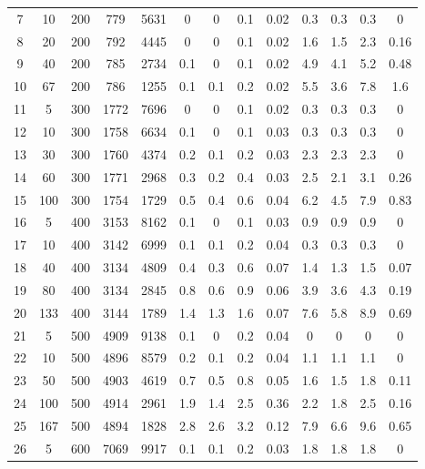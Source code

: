 \documentclass[11pt]{article}
\begin{document}
\begin{table}[]
{\begin{tabular}{ccccc|cccc|cccc}
			7 & 10 & 200 & 779 & 5631 & 0 & 0 & 0.1 & 0.02 & 0.3 & 0.3 & 0.3 & 0 \\
			8 & 20 & 200 & 792 & 4445 & 0 & 0 & 0.1 & 0.02 & 1.6 & 1.5 & 2.3 & 0.16 \\
			9 & 40 & 200 & 785 & 2734 & 0.1 & 0 & 0.1 & 0.02 & 4.9 & 4.1 & 5.2 & 0.48 \\
			10 & 67 & 200 & 786 & 1255 & 0.1 & 0.1 & 0.2 & 0.02 & 5.5 & 3.6 & 7.8 & 1.6 \\
			\rowcolor[HTML]{EFEFEF} 
			11 & 5 & 300 & 1772 & 7696 & 0 & 0 & 0.1 & 0.02 & 0.3 & 0.3 & 0.3 & 0 \\
			\rowcolor[HTML]{EFEFEF} 
			12 & 10 & 300 & 1758 & 6634 & 0.1 & 0 & 0.1 & 0.03 & 0.3 & 0.3 & 0.3 & 0 \\
			\rowcolor[HTML]{EFEFEF} 
			13 & 30 & 300 & 1760 & 4374 & 0.2 & 0.1 & 0.2 & 0.03 & 2.3 & 2.3 & 2.3 & 0 \\
			\rowcolor[HTML]{EFEFEF} 
			14 & 60 & 300 & 1771 & 2968 & 0.3 & 0.2 & 0.4 & 0.03 & 2.5 & 2.1 & 3.1 & 0.26 \\
			\rowcolor[HTML]{EFEFEF} 
			15 & 100 & 300 & 1754 & 1729 & 0.5 & 0.4 & 0.6 & 0.04 & 6.2 & 4.5 & 7.9 & 0.83 \\
			16 & 5 & 400 & 3153 & 8162 & 0.1 & 0 & 0.1 & 0.03 & 0.9 & 0.9 & 0.9 & 0 \\
			17 & 10 & 400 & 3142 & 6999 & 0.1 & 0.1 & 0.2 & 0.04 & 0.3 & 0.3 & 0.3 & 0 \\
			18 & 40 & 400 & 3134 & 4809 & 0.4 & 0.3 & 0.6 & 0.07 & 1.4 & 1.3 & 1.5 & 0.07 \\
			19 & 80 & 400 & 3134 & 2845 & 0.8 & 0.6 & 0.9 & 0.06 & 3.9 & 3.6 & 4.3 & 0.19 \\
			20 & 133 & 400 & 3144 & 1789 & 1.4 & 1.3 & 1.6 & 0.07 & 7.6 & 5.8 & 8.9 & 0.69 \\
			\rowcolor[HTML]{EFEFEF} 
			21 & 5 & 500 & 4909 & 9138 & 0.1 & 0 & 0.2 & 0.04 & 0 & 0 & 0 & 0 \\
			\rowcolor[HTML]{EFEFEF} 
			22 & 10 & 500 & 4896 & 8579 & 0.2 & 0.1 & 0.2 & 0.04 & 1.1 & 1.1 & 1.1 & 0 \\
			\rowcolor[HTML]{EFEFEF} 
			23 & 50 & 500 & 4903 & 4619 & 0.7 & 0.5 & 0.8 & 0.05 & 1.6 & 1.5 & 1.8 & 0.11 \\
			\rowcolor[HTML]{EFEFEF} 
			24 & 100 & 500 & 4914 & 2961 & 1.9 & 1.4 & 2.5 & 0.36 & 2.2 & 1.8 & 2.5 & 0.16 \\
			\rowcolor[HTML]{EFEFEF} 
			25 & 167 & 500 & 4894 & 1828 & 2.8 & 2.6 & 3.2 & 0.12 & 7.9 & 6.6 & 9.6 & 0.65 \\
			26 & 5 & 600 & 7069 & 9917 & 0.1 & 0.1 & 0.2 & 0.03 & 1.8 & 1.8 & 1.8 & 0 \\

\end{tabular}}
\end{table}
\end{document}
